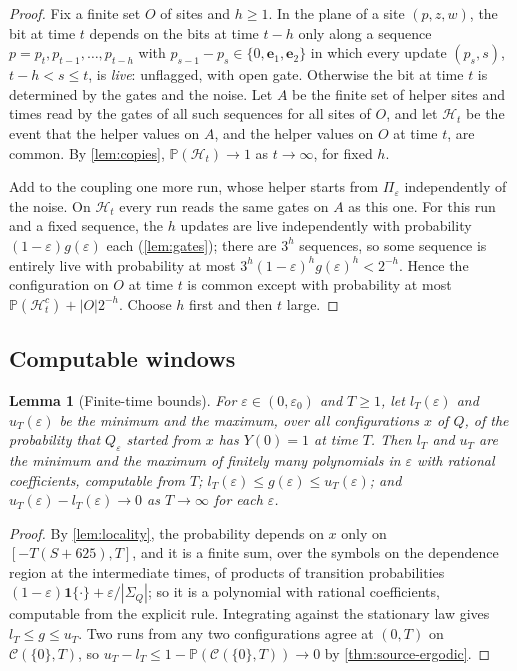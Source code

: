 \documentclass[11pt]{article}
\theoremstyle{plain}
\newtheorem{lemma}[theorem]{Lemma}
\theoremstyle{definition}
\theoremstyle{remark}
\newcommand{\Prob}{\mathbb P}
\newcommand{\eps}{\varepsilon}
\newcommand{\ind}{\mathbf 1}
\newcommand{\SigQ}{\Sigma_Q}
\begin{document}
\begin{proof}
Fix a finite set $O$ of sites and $h\ge1$. In the plane of a site $(p,z,w)$, the bit at time $t$ depends on the bits at time $t-h$ only along a sequence $p=p_t,p_{t-1},\dots,p_{t-h}$ with $p_{s-1}-p_s\in\{0,\mathbf e_1,\mathbf e_2\}$ in which every update $(p_s,s)$, $t-h<s\le t$, is \emph{live}: unflagged, with open gate. Otherwise the bit at time $t$ is determined by the gates and the noise. Let $A$ be the finite set of helper sites and times read by the gates of all such sequences for all sites of $O$, and let $\mathcal H_t$ be the event that the helper values on $A$, and the helper values on $O$ at time $t$, are common. By \cref{lem:copies}, $\Prob(\mathcal H_t)\to1$ as $t\to\infty$, for fixed $h$.

Add to the coupling one more run, whose helper starts from $\Pi_\eps$ independently of the noise. On $\mathcal H_t$ every run reads the same gates on $A$ as this one. For this run and a fixed sequence, the $h$ updates are live independently with probability $(1-\eps)g(\eps)$ each (\cref{lem:gates}); there are $3^h$ sequences, so some sequence is entirely live with probability at most $3^h(1-\eps)^hg(\eps)^h<2^{-h}$. Hence the configuration on $O$ at time $t$ is common except with probability at most $\Prob(\mathcal H_t^c)+|O|2^{-h}$. Choose $h$ first and then $t$ large.
\end{proof}

\subsection{Computable windows}

\begin{lemma}[Finite-time bounds]\label{lem:finite-time}
For $\eps\in(0,\eps_0)$ and $T\ge1$, let $l_T(\eps)$ and $u_T(\eps)$ be the minimum and the maximum, over all configurations $x$ of $Q$, of the probability that $Q_\eps$ started from $x$ has $Y(0)=1$ at time $T$. Then $l_T$ and $u_T$ are the minimum and the maximum of finitely many polynomials in $\eps$ with rational coefficients, computable from $T$; $l_T(\eps)\le g(\eps)\le u_T(\eps)$; and $u_T(\eps)-l_T(\eps)\to0$ as $T\to\infty$ for each $\eps$.
\end{lemma}

\begin{proof}
By \cref{lem:locality}, the probability depends on $x$ only on $[-T(S+625),T]$, and it is a finite sum, over the symbols on the dependence region at the intermediate times, of products of transition probabilities $(1-\eps)\ind\{\cdot\}+\eps/|\SigQ|$; so it is a polynomial with rational coefficients, computable from the explicit rule. Integrating against the stationary law gives $l_T\le g\le u_T$. Two runs from any two configurations agree at $(0,T)$ on $\mathcal C(\{0\},T)$, so $u_T-l_T\le1-\Prob(\mathcal C(\{0\},T))\to0$ by \cref{thm:source-ergodic}.
\end{proof}
\end{document}
